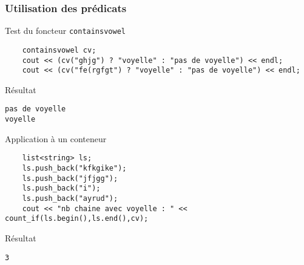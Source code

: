 \begin{frame}[fragile]\frametitle{Utilisation des prédicats}
\begin{codeblock}{Test du foncteur \texttt{containsvowel}}
\begin{lstlisting}
    containsvowel cv;
    cout << (cv("ghjg") ? "voyelle" : "pas de voyelle") << endl;
    cout << (cv("fe(rgfgt") ? "voyelle" : "pas de voyelle") << endl;
\end{lstlisting}
\end{codeblock}
\pause
\begin{block}{Résultat}
{\tiny
\begin{verbatim}
pas de voyelle
voyelle
\end{verbatim}}
\end{block}
\pause\begin{codeblock}{Application à un conteneur}
\begin{lstlisting}
    list<string> ls;
    ls.push_back("kfkgike");
    ls.push_back("jfjgg");
    ls.push_back("i");
    ls.push_back("ayrud");
    cout << "nb chaine avec voyelle : " << count_if(ls.begin(),ls.end(),cv);
\end{lstlisting}
\end{codeblock}
\pause
\begin{block}{Résultat}
{\tiny
\begin{verbatim}
3
\end{verbatim}}
\end{block}
\end{frame}

